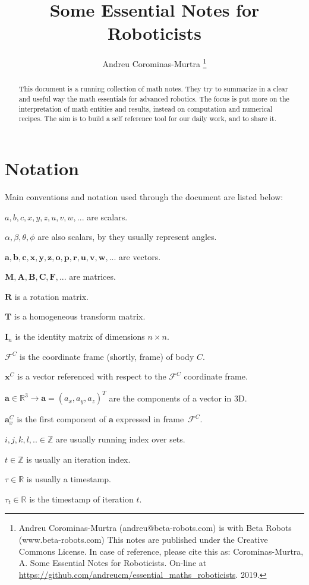\documentclass[a4paper,11pt]{article}
\title{Some Essential Notes for Roboticists}
\author{
  Andreu Corominas-Murtra
  \thanks{
    Andreu Corominas-Murtra (andreu@beta-robots.com) is with Beta Robots (www.beta-robots.com)
    This notes are published under the Creative Commons License. In case of reference, please cite this as: Corominas-Murtra, A. Some Essential Notes for Roboticists. On-line at \url{https://github.com/andreucm/essential_maths_roboticists}. 2019. }
}
\begin{document}
\maketitle

\begin{abstract}
This document is a running collection of math notes. They try to summarize in a clear and useful way the math essentials for advanced robotics. The focus is put more on the interpretation of math entities and results, instead on computation and numerical recipes. The aim is to build a self reference tool for our daily work, and to share it. 
\end{abstract}

\newpage

\tableofcontents

\newpage
\section*{Notation}
Main conventions and notation used through the document are listed below:

$a,b,c,x,y,z,u,v,w,...$ are scalars.

$\alpha,\beta,\theta,\phi$ are also scalars, by they usually represent angles. 

$\mathbf{a,b,c,x,y,z,o,p,r,u,v,w,...}$ are vectors.

$\mathbf{M,A,B,C,F,...}$ are matrices.

$\mathbf{R}$ is a rotation matrix.

$\mathbf{T}$ is a homogeneous transform matrix.

$\mathbf{I}_n$ is the identity matrix of dimensions $n \times n$.

$\mathcal{F}^C$ is the coordinate frame (shortly, frame) of body $C$.

$\mathbf{x}^C$ is a vector referenced with respect to the $\mathcal{F}^C$ coordinate frame.

$\mathbf{a}\in \mathbb{R}^3 \rightarrow \mathbf{a} = (a_x,a_y,a_z)^T$ are the components of a vector in 3D.

$\mathbf{a}^C_x$ is the first component of $\mathbf{a}$ expressed in frame~$\mathcal{F}^C$.

$i,j,k,l,.. \in \mathbb{Z}$ are usually running index over sets. 

$t \in \mathbb{Z}$ is usually an iteration index.

$\tau \in \mathbb{R}$ is usually a timestamp.

$\tau_t \in \mathbb{R}$ is the timestamp of iteration $t$.
\end{document}
